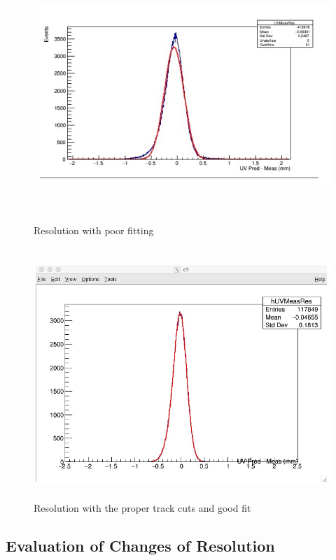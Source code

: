\documentclass[./Thesis]{subfiles}
\begin{document}
\begin{figure}
	\centerline{\includegraphics[height=95mm]{ResolutionNoGoodFit.jpeg}}
	\caption[Spacial Resolution with no track cuts]{ Resolution with poor fitting}
	\label{fig:NoGoodRes}
\end{figure}
	
\begin{figure}
	\centerline{\includegraphics[height=95mm]{GoodRes.jpeg}}
	\caption[Good Resolution]{ Resolution with the proper track cuts and good fit}
	\label{fig:goodRes}
\end{figure} 		
	
	
	 
\subsection{Evaluation of Changes of Resolution}
\end{document}
